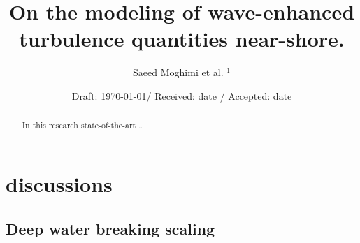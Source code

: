 \documentclass[final]{svjour3}
\begin{document}
\title{ 
On the modeling of wave-enhanced turbulence quantities near-shore.
}

\author{
Saeed Moghimi et al. $^{1}$
}


\date{Draft: \today  /  Received: date  / Accepted: date}

\maketitle
\begin{abstract}
{
In this research state-of-the-art \ldots
}

\end{abstract}

\small
\setcounter{tocdepth}{5}
\tableofcontents
\listoffigures
\listoftables
\newpage
\normalsize 


\section{discussions}
\label{sec:discussions}

\subsection{Deep water breaking scaling} 
\end{document}
